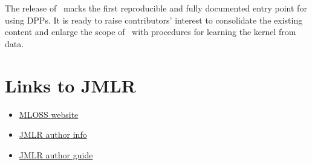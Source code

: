\documentclass[twoside,11pt]{article}
\begin{document}
The release of \DPPy\ marks the first reproducible and fully documented entry point for using DPPs. It is ready to raise contributors' interest to consolidate the existing content and enlarge the scope of \DPPy\ \eg with procedures for learning the kernel from data.


\newpage
{}


\section{Links to JMLR } %
\label{sec:links_to_jmlr_}

  \begin{itemize}
    \item \href{http://www.jmlr.org/mloss/mloss-info.html}{MLOSS website}
    \item \href{http://jmlr.csail.mit.edu/author-info.html}{JMLR author info}
    \item \href{http://www.jmlr.org/format/authors-guide.html}{JMLR author guide}
  \end{itemize}









\end{document}
